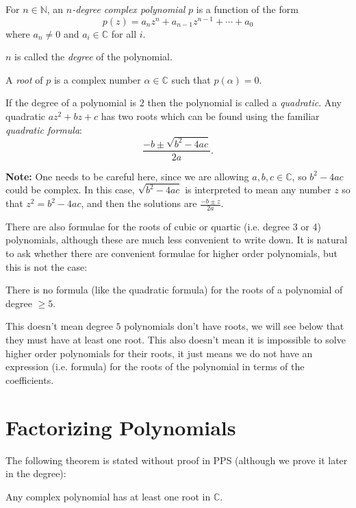 \documentclass[11pt,dvipsnames]{book}
\numberwithin{figure}{section} %
\numberwithin{table}{section} %
\begin{document}
\begin{definition}
For $n\in\mathbb{N}$, an {\it $n$-degree complex polynomial} \(p\) is a function of the form
\begin{equation}
\label{e:pz}
p(z)=a_nz^n + a_{n-1}z^{n-1} + \cdots + a_0
\end{equation}
where $a_n \neq 0$ and $a_i \in \mathbb{C}$ for all $i$.

\(n\) is called the {\em degree} of the polynomial.

A {\it root} of $p$ is a complex number  $\alpha\in\mathbb{C}$ such that $p(\alpha)=0$.
\end{definition}

If the degree of a polynomial is \(2\) then the polynomial is called a {\em quadratic}.   Any quadratic $az^2+bz+c$ has two roots which can be found using the familiar {\it quadratic formula}:
\[\frac{-b\pm \sqrt{b^2-4ac}}{2a}.\]

{\bf Note:} One needs to be careful here, since we are allowing $a,b,c\in\mathbb{C}$, so  $b^2-4ac$ could be complex. In this case, $\sqrt{b^2-4ac}$ is interpreted to mean any number $z$ so that $z^2=b^2-4ac$, and then the solutions are $\frac{-b\pm z}{2a}$.

There are also formulae for the roots of cubic or quartic (i.e. degree 3 or 4) polynomials, although these are much less convenient to write down. It is natural to ask whether there are convenient formulae for higher order polynomials, but this is not the case:

\begin{theorem} There is no formula (like the quadratic formula) for the roots of a polynomial of degree $\geq 5$.
\end{theorem}

This doesn't mean degree $5$ polynomials don't have roots, we will see below that they must have at least one root. This also doesn't mean it is impossible to solve higher order polynomials for their roots, it just means we do not have an expression (i.e. formula) for the roots of the polynomial in terms of the coefficients.

\section{Factorizing Polynomials}

The following theorem is stated without proof in PPS (although we prove it later in the degree):

\begin{theorem}
Any complex polynomial has at least one root in $\mathbb{C}$.
\end{theorem}
\end{document}
